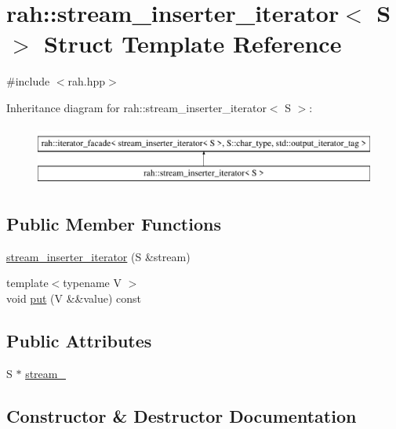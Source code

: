 \hypertarget{structrah_1_1stream__inserter__iterator}{}\section{rah\+::stream\+\_\+inserter\+\_\+iterator$<$ S $>$ Struct Template Reference}
\label{structrah_1_1stream__inserter__iterator}


{\ttfamily \#include $<$rah.\+hpp$>$}

Inheritance diagram for rah\+::stream\+\_\+inserter\+\_\+iterator$<$ S $>$\+:\begin{figure}[H]
\begin{center}
\leavevmode
\includegraphics[height=2.000000cm]{structrah_1_1stream__inserter__iterator}
\end{center}
\end{figure}
\subsection*{Public Member Functions}
\begin{DoxyCompactItemize}
\item 
\mbox{\hyperlink{structrah_1_1stream__inserter__iterator_a0b096d8edfc691c1fdadd919252ce87d}{stream\+\_\+inserter\+\_\+iterator}} (S \&stream)
\item 
{\footnotesize template$<$typename V $>$ }\\void \mbox{\hyperlink{structrah_1_1stream__inserter__iterator_a449c0bfdb9f253260430c0184ef370fe}{put}} (V \&\&value) const
\end{DoxyCompactItemize}
\subsection*{Public Attributes}
\begin{DoxyCompactItemize}
\item 
S $\ast$ \mbox{\hyperlink{structrah_1_1stream__inserter__iterator_aa5b590a04a36ca43ba67adf772418897}{stream\+\_\+}}
\end{DoxyCompactItemize}


\subsection{Constructor \& Destructor Documentation}
\mbox{\label{structrah_1_1stream__inserter__iterator_a0b096d8edfc691c1fdadd919252ce87d}} 
